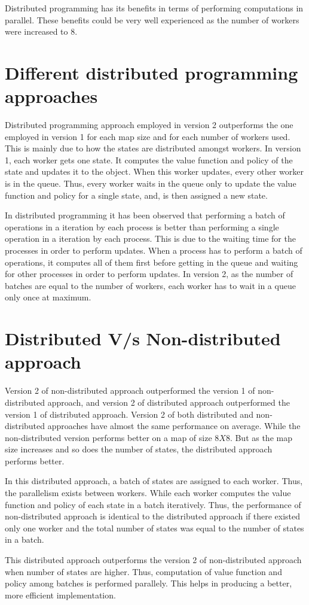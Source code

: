 \documentclass[11pt]{article}
\begin{document}
Distributed programming has its benefits in terms of performing computations in parallel. These benefits could be very well experienced as the number of workers were increased to 8.

\section{Different distributed programming approaches}
\label{section:dist}

Distributed programming approach employed in version 2 outperforms the one employed in version 1 for each map size and for each number of workers used. This is mainly due to how the states are distributed amongst workers. In version 1, each worker gets one state. It computes the value function and policy of the state and updates it to the object. When this worker updates, every other worker is in the queue. Thus, every worker waits in the queue only to update the value function and policy for a single state, and, is then assigned a new state.

In distributed programming it has been observed that performing a batch of operations in a iteration by each process is better than performing a single operation in a iteration by each process. This is due to the waiting time for the processes in order to perform updates. When a process has to perform a batch of operations, it computes all of them first before getting in the queue and waiting for other processes in order to perform updates. In version 2, as the number of batches are equal to the number of workers, each worker has to wait in a queue only once at maximum.


\section{Distributed V/s Non-distributed approach}
\label{section:approach}



Version 2 of non-distributed approach outperformed the version 1 of non-distributed approach, and version 2 of distributed approach outperformed the version 1 of distributed approach. Version 2 of both distributed and non-distributed approaches have almost the same performance on average. While the non-distributed version performs better on a map of size $8 X 8$. But as the map size increases and so does the number of states, the distributed approach performs better.

In this distributed approach, a batch of states are assigned to each worker. Thus, the parallelism exists between workers. While each worker computes the value function and policy of each state in a batch iteratively. Thus, the performance of non-distributed approach is identical to the distributed approach if there existed only one worker and the total number of states was equal to the number of states in a batch.

This distributed approach outperforms the version 2 of non-distributed approach when number of states are higher. Thus, computation of value function and policy among batches is performed parallely. This helps in producing a better, more efficient implementation.
\end{document}
